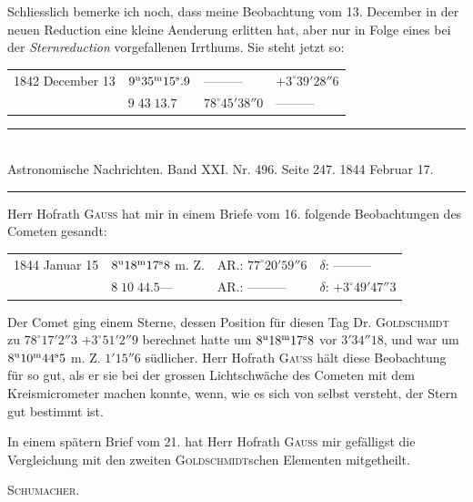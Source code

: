 Schliesslich bemerke ich noch, dass meine Beobachtung vom 13. December in der neuen Reduction eine kleine Aenderung erlitten hat, aber nur in Folge eines bei der \emph{Sternreduction} vorgefallenen Irrthums. Sie steht jetzt so:
\begin{center}
\begin{tabular}{l|l|l|l}
1842 December 13 & $9^{\rm u}35^{\rm m}15^{\rm s}.9$ & ---\quad ---\quad --- & $+3^\circ39'28''6$ \\
 & $9\;43\;13.7$ & $78^\circ45'38''0$ & ---\quad ---\quad --- \\
\end{tabular}
\end{center}

\clearpage
\hypertarget{native-470-report}{}
\begin{center}
\rule{0.55\linewidth}{0.4pt}\\[2pt]
Astronomische Nachrichten. Band XXI. Nr. 496. Seite 247. 1844 Februar 17.\\[2pt]
\rule{0.55\linewidth}{0.4pt}
\end{center}

Herr Hofrath \textsc{Gauss} hat mir in einem Briefe vom 16. folgende Beobachtungen des Cometen gesandt:
\begin{center}
\begin{tabular}{l|l|l|l}
1844 Januar 15 & $8^{\rm u}18^{\rm m}17^{\rm s}8$ m. Z. & AR.: $77^\circ20'59''6$ & $\delta$: ---\quad ---\quad --- \\
 & $8\;10\;44.5$\quad --- & AR.: ---\quad ---\quad --- & $\delta$: $+3^\circ49'47''3$ \\
\end{tabular}
\end{center}

Der Comet ging einem Sterne, dessen Position für diesen Tag Dr. \textsc{Goldschmidt} zu $78^\circ17'2''3$ $+3^\circ51'2''9$ berechnet hatte um $8^{\rm u}18^{\rm m}17^{\rm s}8$ vor $3'34''18$, und war um $8^{\rm u}10^{\rm m}44^{\rm s}5$ m. Z. $1'15''6$ südlicher. Herr Hofrath \textsc{Gauss} hält diese Beobachtung für so gut, als er sie bei der grossen Lichtschwäche des Cometen mit dem Kreismicrometer machen konnte, wenn, wie es sich von selbst versteht, der Stern gut bestimmt ist.

In einem spätern Brief vom 21. hat Herr Hofrath \textsc{Gauss} mir gefälligst die Vergleichung mit den zweiten \textsc{Goldschmidt}schen Elementen mitgetheilt.
\begin{flushright}\textsc{Schumacher.}\end{flushright}
